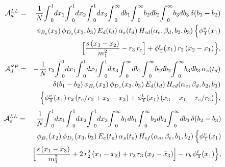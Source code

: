 \documentclass[preprint,superscriptaddress,nofootinbib]{revtex4}
\begin{document}
\begin{appendix}
   \begin{eqnarray}
  {\cal A}_{d}^{LL} &=& \frac{1}{N}
  {\int}_{0}^{1}dx_{1} {\int}_{0}^{1}dx_{2} {\int}_{0}^{1}dx_{3}
  {\int}_{0}^{\infty} db_{1}
  {\int}_{0}^{\infty}b_{2} db_{2}
  {\int}_{0}^{\infty}b_{3} db_{3}\,
  {\delta}(b_{1}-b_{2})
   \nonumber \\ & &
  {\phi}_{B_{c}}(x_{2})\, {\phi}_{D_{s}}(x_{3},b_{3})\,
  E_{d}(t_{d})\,{\alpha}_{s}(t_{d})\,
  H_{cd}({\alpha}_{e},{\beta}_{d},b_{2},b_{3})\,
   \Big\{ {\phi}_{\Upsilon}^{v}(x_{1})
   \nonumber \\ & &
   \Big[ \frac{s\,(x_{3}-x_{2})}{m_{1}^{2}}-r_{3}\,r_{c} \Big]
   +{\phi}_{\Upsilon}^{t}(x_{1})\,r_{2}\,(x_{2}-x_{1}) \Big\}
   \label{amp-figd-01}, \\
  {\cal A}_{d}^{SP} &=& -\frac{1}{N}\,r_{3}
  {\int}_{0}^{1}dx_{1} {\int}_{0}^{1}dx_{2} {\int}_{0}^{1}dx_{3}
  {\int}_{0}^{\infty} db_{1}
  {\int}_{0}^{\infty}b_{2} db_{2}
  {\int}_{0}^{\infty}b_{3} db_{3}\,{\alpha}_{s}(t_{d})
   \nonumber \\ & &
  {\delta}(b_{1}-b_{2})\,
  {\phi}_{B_{c}}(x_{2})\, {\phi}_{D_{s}}(x_{3},b_{3})\,
  E_{d}(t_{d})\,
  H_{cd}({\alpha}_{e},{\beta}_{d},b_{2},b_{3})
   \nonumber \\ & &
   \Big\{ {\phi}_{\Upsilon}^{v}(x_{1})\, r_{2}\, (r_{c}/r_{3}+x_{2}-x_{3})
 +{\phi}_{\Upsilon}^{t}(x_{1})\,(x_{3}-x_{1}-r_{c}/r_{3}) \Big\}
   \label{amp-figd-03},
   \end{eqnarray}
   \begin{eqnarray}
  {\cal A}_{e}^{LL} &=& \frac{1}{N}
  {\int}_{0}^{1}dx_{1} {\int}_{0}^{1}dx_{2} {\int}_{0}^{1}dx_{3}
  {\int}_{0}^{\infty}b_{1} db_{1} {\int}_{0}^{\infty}b_{2} db_{2}
  {\int}_{0}^{\infty} db_{3}\, {\delta}(b_{2}-b_{3})
   \nonumber \\ & &
  {\phi}_{B_{c}}(x_{2})\, {\phi}_{D_{s}}(x_{3},b_{3})\,
  E_{e}(t_{e})\,{\alpha}_{s}(t_{e})\,
  H_{ef}({\alpha}_{a},{\beta}_{e},b_{1},b_{2})\,
   \Big\{ {\phi}_{\Upsilon}^{v}(x_{1})
   \nonumber \\ & &
   \Big[ \frac{s\,(x_{1}-\bar{x}_{3})}{m_{1}^{2}}
   +2\,r_{2}^{2}\,(x_{1}-x_{2})
   +r_{2}\,r_{3}\,(x_{2}-\bar{x}_{3}) \Big]
   -r_{b}\,{\phi}_{\Upsilon}^{t}(x_{1}) \Big\}
   \label{amp-fige-01}, \\

\end{eqnarray}
\end{appendix}
\end{document}
